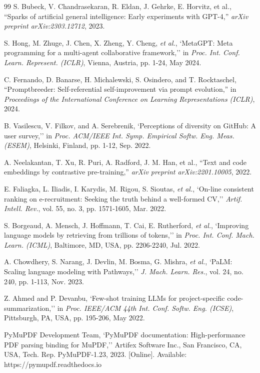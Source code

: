 \documentclass[12pt,a4paper]{report}
\begin{document}
\begin{thebibliography}{99}
S. Bubeck, V. Chandrasekaran, R. Eldan, J. Gehrke, E. Horvitz, et al., ``Sparks of artificial general intelligence: Early experiments with GPT-4,'' \textit{arXiv preprint arXiv:2303.12712}, 2023.

S. Hong, M. Zhuge, J. Chen, X. Zheng, Y. Cheng, \textit{et al.}, `MetaGPT: Meta programming for a multi-agent collaborative framework,'' in \textit{Proc. Int. Conf. Learn. Represent. (ICLR)}, Vienna, Austria, pp. 1-24, May 2024.

C. Fernando, D. Banarse, H. Michalewski, S. Osindero, and T. Rocktaschel, ``Promptbreeder: Self-referential self-improvement via prompt evolution,'' in \textit{Proceedings of the International Conference on Learning Representations (ICLR)}, 2024.

B. Vasilescu, V. Filkov, and A. Serebrenik, `Perceptions of diversity on GitHub: A user survey,'' in \textit{Proc. ACM/IEEE Int. Symp. Empirical Softw. Eng. Meas. (ESEM)}, Helsinki, Finland, pp. 1-12, Sep. 2022.

A. Neelakantan, T. Xu, R. Puri, A. Radford, J. M. Han, et al., ``Text and code embeddings by contrastive pre-training,'' \textit{arXiv preprint arXiv:2201.10005}, 2022.

E. Faliagka, L. Iliadis, I. Karydis, M. Rigou, S. Sioutas, \textit{et al.}, `On-line consistent ranking on e-recruitment: Seeking the truth behind a well-formed CV,'' \textit{Artif. Intell. Rev.}, vol. 55, no. 3, pp. 1571-1605, Mar. 2022.

S. Borgeaud, A. Mensch, J. Hoffmann, T. Cai, E. Rutherford, \textit{et al.}, `Improving language models by retrieving from trillions of tokens,'' in \textit{Proc. Int. Conf. Mach. Learn. (ICML)}, Baltimore, MD, USA, pp. 2206-2240, Jul. 2022.

A. Chowdhery, S. Narang, J. Devlin, M. Bosma, G. Mishra, \textit{et al.}, `PaLM: Scaling language modeling with Pathways,'' \textit{J. Mach. Learn. Res.}, vol. 24, no. 240, pp. 1-113, Nov. 2023.

Z. Ahmed and P. Devanbu, `Few-shot training LLMs for project-specific code-summarization,'' in \textit{Proc. IEEE/ACM 44th Int. Conf. Softw. Eng. (ICSE)}, Pittsburgh, PA, USA, pp. 195-206, May 2022.

PyMuPDF Development Team, `PyMuPDF documentation: High-performance PDF parsing binding for MuPDF,'' Artifex Software Inc., San Francisco, CA, USA, Tech. Rep. PyMuPDF-1.23, 2023. [Online]. Available: https://pymupdf.readthedocs.io


\end{thebibliography}
\end{document}
